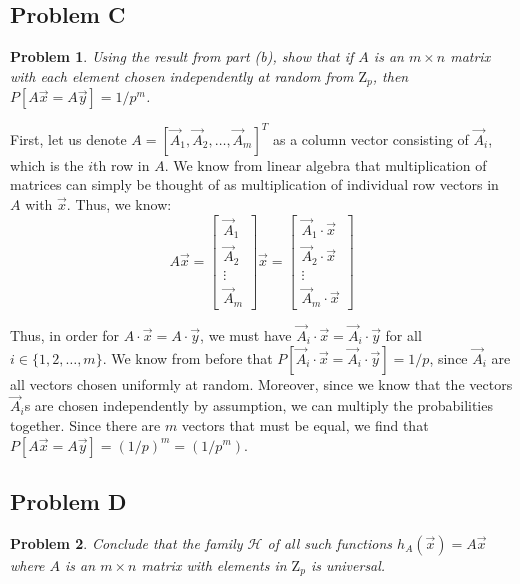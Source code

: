 \documentclass[psamsfonts]{amsart}
\newtheorem{prob}{Problem}[section]
\newenvironment{sol}{{\bfseries Solution}}{\qedsymbol}
\theoremstyle{definition}
\theoremstyle{remark}
\numberwithin{equation}{section}
\begin{document}
\subsection{Problem C}

\begin{prob}
Using the result from part (b), show that if $A$ is an $m \times n$ matrix with each element chosen independently at random from $\mathrm{Z}_p$, then $P[A \vec{x} = A \vec{y}] = 1/ p^m$. 
\end{prob}

\begin{sol}
First, let us denote $A = [\vec{A}_1, \vec{A}_2, \ldots, \vec{A}_m]^{T}$ as a column vector consisting of $\vec{A}_i$, which is the $i$th row in $A$. We know from linear algebra that multiplication of matrices can simply be thought of as multiplication of individual row vectors in $A$ with $\vec{x}$. Thus, we know:
\begin{equation}
A \vec{x} = \left[ \begin{array}{c}
\vec{A}_1 \\
\vec{A}_2 \\
\vdots \\
\vec{A}_m 
\end{array}
\right] \vec{x} =  \left[ \begin{array}{c}
\vec{A}_1 \cdot \vec{x} \\
\vec{A}_2 \cdot \vec{x} \\
\vdots \\
\vec{A}_m \cdot \vec{x}
\end{array}
\right] 
\end{equation} 

Thus, in order for $A \cdot \vec{x} = A \cdot \vec{y}$, we must have $\vec{A}_i \cdot \vec{x} = \vec{A}_i \cdot \vec{y}$ for all $i \in \{1,2, \ldots, m\}$. We know from before that $P[\vec{A}_i \cdot \vec{x} = \vec{A}_i \cdot \vec{y}] = 1/p$, since $\vec{A}_i$ are all vectors chosen uniformly at random. Moreover, since we know that the vectors $\vec{A}_i$s are chosen independently by assumption, we can multiply the probabilities together. Since there are $m$ vectors that must be equal, we find that $P[A \vec{x} = A \vec{y}] = (1/p)^m = (1/p^m)$.
\end{sol}

\subsection{Problem D}

\begin{prob}
Conclude that the family $\mathcal{H}$ of all such functions $h_A(\vec{x}) = A \vec{x}$ where $A$ is an $m \times n$ matrix with elements in $\mathrm{Z}_p$ is universal.
\end{prob}
\end{document}
